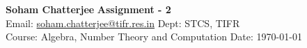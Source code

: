 \documentclass[a4paper, 11pt]{article}
\begin{document}
	
	
	\textsf{\noindent \large\textbf{Soham Chatterjee} \hfill \textbf{Assignment - 2}\\
		Email: \href{soham.chatterjee@tifr.res.in}{soham.chatterjee@tifr.res.in} \hfill Dept: STCS, TIFR\\
		\normalsize Course: Algebra, Number Theory and Computation \hfill Date: \today}
	
\end{document}
